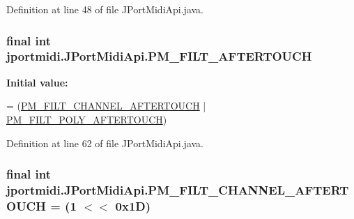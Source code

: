 Definition at line 48 of file J\+Port\+Midi\+Api.\+java.

\subsubsection[{\texorpdfstring{P\+M\+\_\+\+F\+I\+L\+T\+\_\+\+A\+F\+T\+E\+R\+T\+O\+U\+CH}{PM_FILT_AFTERTOUCH}}]{\setlength{\rightskip}{0pt plus 5cm}final {\bf int} jportmidi.\+J\+Port\+Midi\+Api.\+P\+M\+\_\+\+F\+I\+L\+T\+\_\+\+A\+F\+T\+E\+R\+T\+O\+U\+CH\hspace{0.3cm}{\ttfamily [static]}}\hypertarget{classjportmidi_1_1_j_port_midi_api_a48c81d67b7ab4206d466cf1196d87bd7}{}\label{classjportmidi_1_1_j_port_midi_api_a48c81d67b7ab4206d466cf1196d87bd7}
{\bfseries Initial value\+:}
\begin{DoxyCode}
= 
            (\hyperlink{classjportmidi_1_1_j_port_midi_api_acec7f9f30be5f5b1b3e1361ff1c8031d}{PM\_FILT\_CHANNEL\_AFTERTOUCH} | 
      \hyperlink{classjportmidi_1_1_j_port_midi_api_a4fa4256dcbf1253c1c0907cf4d90c5e9}{PM\_FILT\_POLY\_AFTERTOUCH})
\end{DoxyCode}


Definition at line 62 of file J\+Port\+Midi\+Api.\+java.

\subsubsection[{\texorpdfstring{P\+M\+\_\+\+F\+I\+L\+T\+\_\+\+C\+H\+A\+N\+N\+E\+L\+\_\+\+A\+F\+T\+E\+R\+T\+O\+U\+CH}{PM_FILT_CHANNEL_AFTERTOUCH}}]{\setlength{\rightskip}{0pt plus 5cm}final {\bf int} jportmidi.\+J\+Port\+Midi\+Api.\+P\+M\+\_\+\+F\+I\+L\+T\+\_\+\+C\+H\+A\+N\+N\+E\+L\+\_\+\+A\+F\+T\+E\+R\+T\+O\+U\+CH = (1 $<$$<$ 0x1\+D)\hspace{0.3cm}{\ttfamily [static]}}\hypertarget{classjportmidi_1_1_j_port_midi_api_acec7f9f30be5f5b1b3e1361ff1c8031d}{}\label{classjportmidi_1_1_j_port_midi_api_acec7f9f30be5f5b1b3e1361ff1c8031d}


